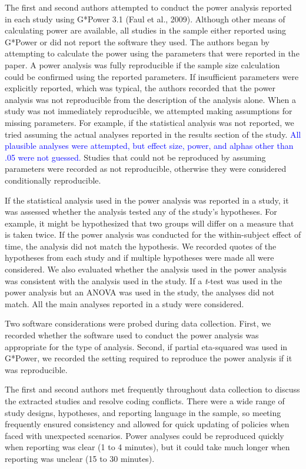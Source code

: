 \documentclass[
  man, donotrepeattitle,mask,floatsintext]{apa7}
\begin{document}
The first and second authors attempted to conduct the power analysis reported in each study using G*Power 3.1 (Faul et al., 2009). Although other means of calculating power are available, all studies in the sample either reported using G*Power or did not report the software they used. The authors began by attempting to calculate the power using the parameters that were reported in the paper. A power analysis was fully reproducible if the sample size calculation could be confirmed using the reported parameters. If insufficient parameters were explicitly reported, which was typical, the authors recorded that the power analysis was not reproducible from the description of the analysis alone. When a study was not immediately reproducible, we attempted making assumptions for missing parameters. For example, if the statistical analysis was not reported, we tried assuming the actual analyses reported in the results section of the study. \textcolor{blue}{All plausible analyses were attempted, but effect size, power, and alphas other than .05 were not guessed.} Studies that could not be reproduced by assuming parameters were recorded as not reproducible, otherwise they were considered conditionally reproducible.

If the statistical analysis used in the power analysis was reported in a study, it was assessed whether the analysis tested any of the study's hypotheses. For example, it might be hypothesized that two groups will differ on a measure that is taken twice. If the power analysis was conducted for the within-subject effect of time, the analysis did not match the hypothesis. We recorded quotes of the hypotheses from each study and if multiple hypotheses were made all were considered. We also evaluated whether the analysis used in the power analysis was consistent with the analysis used in the study. If a \emph{t}-test was used in the power analysis but an ANOVA was used in the study, the analyses did not match. All the main analyses reported in a study were considered.

Two software considerations were probed during data collection. First, we recorded whether the software used to conduct the power analysis was appropriate for the type of analysis. Second, if partial eta-squared was used in G*Power, we recorded the setting required to reproduce the power analysis if it was reproducible.

The first and second authors met frequently throughout data collection to discuss the extracted studies and resolve coding conflicts. There were a wide range of study designs, hypotheses, and reporting language in the sample, so meeting frequently ensured consistency and allowed for quick updating of policies when faced with unexpected scenarios. Power analyses could be reproduced quickly when reporting was clear (1 to 4 minutes), but it could take much longer when reporting was unclear (15 to 30 minutes).
\end{document}
